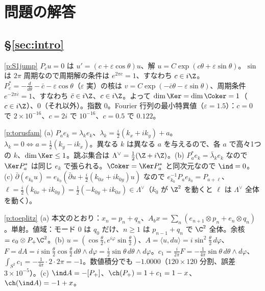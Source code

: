 
\section{問題の解答}\label{sec:solutions}
\subsection*{\S\ref{sec:intro}}
\begin{sol}{\ref{p:S1jump}}
$P_cu=0$ は $u'=(c+\varepsilon\cos\theta)u$、解 $u=C\exp(c\theta+\varepsilon\sin\theta)$。$\sin$ は $2\pi$ 周期なので周期解の条件は $e^{2\pi c}=1$、すなわち $c\in i\Z$。$P_c^*=-\frac d{d\theta}-\bar c-\varepsilon\cos\theta$（$\varepsilon$ 実）の核は $v=C\exp(-\bar c\theta-\varepsilon\sin\theta)$、周期条件 $e^{-2\pi\bar c}=1$、すなわち $\bar c\in i\Z$、$c\in i\Z$。よって $\dim\Ker=\dim\Coker=1$（$c\in i\Z$）、$0$（それ以外）。指数 $0$。Fourier 行列の最小特異値（$\varepsilon=1.5$）：$c=0$ で $2\times10^{-16}$、$c=2i$ で $10^{-16}$、$c=0.5$ で $0.122$。
\end{sol}
\begin{sol}{\ref{p:torusfam}}
(a) $P_ae_k=\lambda_ke_k$、$\lambda_k=\frac i2(k_x+ik_y)+a$。$\lambda_k=0\iff a=\frac12(k_y-ik_x)$。異なる $k$ は異なる $a$ を与えるので、各 $a$ で高々1つの $k$、$\dim\Ker\le1$。跳ぶ集合は $\Lambda^\vee=\frac12(\Z+i\Z)$。(b) $P_a^*e_k=\bar\lambda_ke_k$ なので $\Ker P_a^*$ は同じ $e_k$ で張られる。$\Coker=\Ker P_a^*$ と同次元なので $\ind=0$。(c) $\bar\partial(e_{k_0}u)=e_{k_0}(\bar\partial u+\frac i2(k_{0x}+ik_{0y})u)$ なので $e_{k_0}^{-1}P_ae_{k_0}=P_{a+\ell}$、$\ell=\frac i2(k_{0x}+ik_{0y})=\frac12(-k_{0y}+ik_{0x})\in\Lambda^\vee$（$k_0$ が $\Z^2$ を動くと $\ell$ は $\Lambda^\vee$ 全体を動く）。
\end{sol}
\begin{sol}{\ref{p:toeplitz}}
(a) 本文のとおり：$x_n=p_n+q_n$、$A_bx=\sum_n(e_{n+1}\otimes p_n+e_n\otimes q_n)$。単射。値域：モード $0$ は $q_0$ だけ、$n\ge1$ は $p_{n-1}+q_n$ で $\C^2$ 全体。余核 $=e_0\otimes P_+\C^2$。(b) $u=(\cos\frac\theta2,e^{i\varphi}\sin\frac\theta2)$、$A=\langle u,du\rangle=i\sin^2\frac\theta2\,d\varphi$、$F=dA=i\sin\frac\theta2\cos\frac\theta2\,d\theta\wedge d\varphi=\frac i2\sin\theta\,d\theta\wedge d\varphi$。$c_1=\frac i{2\pi}F=-\frac1{4\pi}\sin\theta\,d\theta\wedge d\varphi$、$\int_{S^2}c_1=-\frac{1}{4\pi}\cdot2\cdot2\pi=-1$。数値積分でも $-1.0000$（$120\times120$ 分割、誤差 $3\times10^{-5}$）。(c) $\ind A=-[P_+]$、$\ch(P_+)=1+c_1=1-x$、$\ch(\ind A)=-1+x$。
\end{sol}
